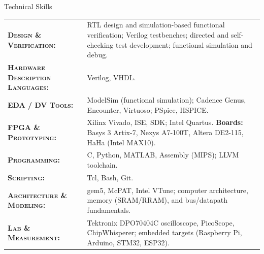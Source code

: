 \begin{rSection}{Technical Skills}

\begin{tabularx}{\textwidth}{@{}p{6cm} X@{}}
    \textsc{\textbf{Design \& Verification:}} & RTL design and simulation-based functional verification; Verilog testbenches; directed and self-checking test development; functional simulation and debug.\\
    \textsc{\textbf{Hardware Description Languages:}} & Verilog, VHDL.\\
    \textsc{\textbf{EDA / DV Tools:}} & ModelSim (functional simulation); Cadence Genus, Encounter, Virtuoso; PSpice, HSPICE.\\
    \textsc{\textbf{FPGA \& Prototyping:}} & Xilinx Vivado, ISE, SDK; Intel Quartus. \textbf{Boards:} Basys 3 Artix-7, Nexys A7-100T, Altera DE2-115, HaHa (Intel MAX10).\\
    \textsc{\textbf{Programming:}} & C, Python, MATLAB, Assembly (MIPS); LLVM toolchain.\\
    \textsc{\textbf{Scripting:}} & Tcl, Bash, Git.\\
    \textsc{\textbf{Architecture \& Modeling:}} & gem5, McPAT, Intel VTune; computer architecture, memory (SRAM/RRAM), and bus/datapath fundamentals.\\
    \textsc{\textbf{Lab \& Measurement:}} & Tektronix DPO70404C oscilloscope, PicoScope, ChipWhisperer; embedded targets (Raspberry Pi, Arduino, STM32, ESP32).\\
\end{tabularx}

\end{rSection}
